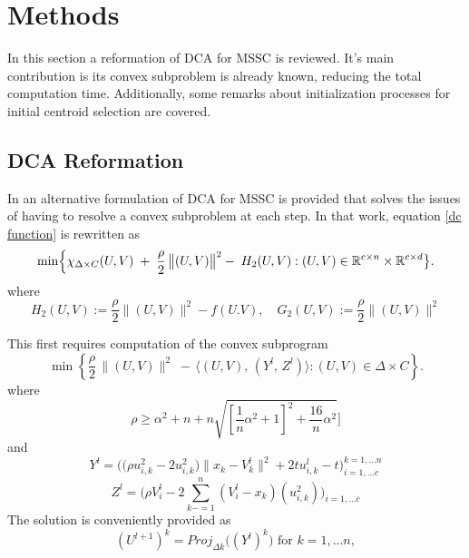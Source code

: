 \section{Methods}
In this section a reformation of DCA for MSSC is reviewed. It's main contribution is its convex subproblem is already known, reducing the total computation time. Additionally, some remarks about initialization processes for initial centroid selection are covered. 

\subsection{DCA Reformation}
In \cite{an_minimum_2009} an alternative formulation of DCA for MSSC is provided that solves the issues of having to resolve a convex subproblem at each step. In that work, equation \ref{dc function} is rewritten as
\begin{equation}
\min
\Bigl\{
\chi_{\Delta \times C}(U,V)
\;+\;
\frac{\rho}{2}\,\bigl\lVert (U,V)\bigr\rVert^2
\; \\
-\;
H_{2}(U,V)
:(U,V)\in \mathbb{R}^{c\times n}\times \mathbb{R}^{c\times d}\bigl\}.
\label{eq:dca18}
\end{equation}
where 
\begin{equation}
    H_2(U,V):=\frac{\rho}{2}\|(U,V)\|^2 -f(U.V),\quad G_2(U,V):=\frac{\rho}{2}\|(U,V)\|^2
\end{equation}



This first requires computation of the convex subprogram 
\begin{equation}
\min
\left\{
\frac{\rho}{2}\,\bigl\lVert (U,V)\bigr\rVert^2
\;-\,\bigl\langle (U,V),\,(Y^l,\,Z^l)\bigr\rangle:{(U,V)\in \Delta \times C}
\right\}.
\end{equation}
where
\begin{equation}
    \rho \ge \alpha^2+n+n \sqrt{[\frac{1}{n}\alpha^2+1]^2+\frac{16}{n}\alpha^2}\big]
\end{equation}
and 
\begin{equation}
    Y^l =\bigr(\bigr(\rho u^2_{i,k}-2 u^2_{i,k}\big)\|x_k-V^l_k\|^2+2tu^l_{i,k}-t\big)_{i=1,...c}^{k=1,...n}
    \label{Y}
\end{equation}
\begin{equation}
    Z^l=\bigr(\rho V_i^l-2\sum_{k-=1}^{n}(V^l_i-x_k)(u^2_{i,k})\bigr)_{i=1,...c}
    \label{Z}
\end{equation}
The solution is conveniently \cite{an_minimum_2009} provided as 
\begin{equation}
    (U^{l+1})^k= Proj_{\Delta k}\bigr((Y^l)^k) \text{ for } k=1,...n,
    \label{projectk}
\end{equation}
    
